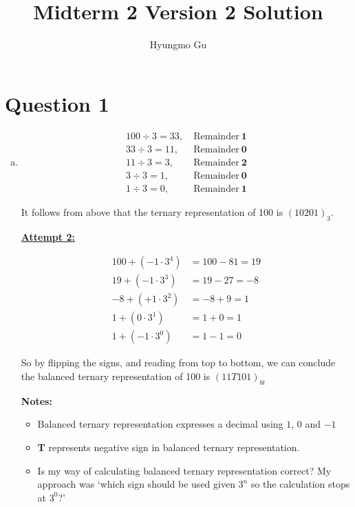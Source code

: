 \documentclass[12pt]{article}
\begin{document}
\title{Midterm 2 Version 2 Solution}
\author{Hyungmo Gu}
\maketitle

\section*{Question 1}
\begin{enumerate}[a.]
    \item

    \begin{align*}
        100 \div 3 = 33,&\:\text{Remainder}\:\textbf{1}\\
        33 \div 3 = 11,&\:\text{Remainder}\:\textbf{0}\\
        11 \div 3 = 3,&\:\text{Remainder}\:\textbf{2}\\
        3 \div 3 = 1,&\:\text{Remainder}\:\textbf{0}\\
        1 \div 3 = 0,&\:\text{Remainder}\:\textbf{1}
    \end{align*}

    \bigskip

    It follows from above that the ternary representation of 100 is $(10201)_3$.

    \bigskip

    \begin{mdframed}
        \underline{\textbf{Attempt 2:}}

        \color{red}
        \setcounter{equation}{0}
        \begin{align*}
            100 + (-1 \cdot 3^4) &= 100 - 81 = 19\\
            19 + (-1 \cdot 3^3) &= 19 - 27 = -8\\
            -8 + (+1 \cdot 3^2) &= -8 + 9 = 1\\
            1 + (0 \cdot 3^1) &= 1 + 0 = 1\\
            1 + (-1 \cdot 3^0) &= 1 - 1 = 0
        \end{align*}

        So by flipping the signs, and reading from top to bottom, we can conclude
        the balanced ternary representation of 100 is $(11T101)_{bt}$
        \color{black}
    \end{mdframed}

    \textbf{Notes:}

    \begin{itemize}
        \item Balanced ternary representation expresses a decimal using $1$, $0$ and $-1$
        \item \textbf{T} represents negative sign in balanced ternary representation.
        \item Is my way of calculating balanced ternary representation correct? My
        approach was `which sign should be used given $3^n$ so the calculation stops
        at $3^0$?'
    \end{itemize}



\end{enumerate}
\end{document}
